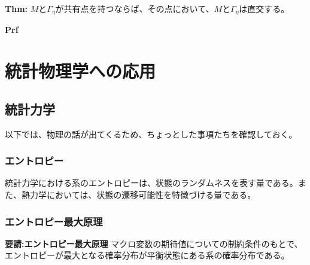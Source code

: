 \documentclass[a4paper,11pt]{jsarticle}
\numberwithin{equation}{section}
\begin{document}
\begin{itembox}[l]{\textbf{Thm:}}
    $M$と$\Gamma_{\eta}$が共有点を持つならば、その点において、$M$と$\Gamma_{\eta}$は直交する。
\end{itembox}
\textbf{Prf}\\

\newpage
\section{統計物理学への応用}
\subsection{統計力学}
以下では、物理の話が出てくるため、ちょっとした事項たちを確認しておく。

\subsubsection{エントロピー}
統計力学における系のエントロピーは、状態のランダムネスを表す量である。また、熱力学においては、状態の遷移可能性を特徴づける量である。
\subsubsection{エントロピー最大原理}
\begin{itembox}[l]{\textbf{要請:エントロピー最大原理}}
    マクロ変数の期待値についての制約条件のもとで、エントロピーが最大となる確率分布が平衡状態にある系の確率分布である。
\end{itembox}
\end{document}
